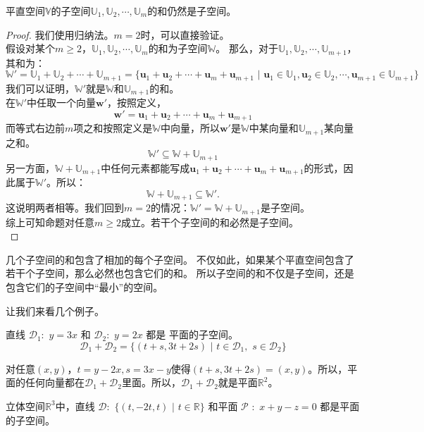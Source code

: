 \documentclass[12pt,UTF8,fontset=none]{ctexbook}
\begin{document}
\begin{pp}\label{pp:1_7}
    平直空间$\mathbb{V}$的子空间$\mathbb{U}_1, \mathbb{U}_2, \cdots , \mathbb{U}_m$的和仍然是子空间。
\end{pp}
\begin{proof} %
我们使用归纳法。$m=2$时，可以直接验证。\\
假设对某个$m \ge 2$，$\mathbb{U}_1, \mathbb{U}_2, \cdots , \mathbb{U}_m$的和为子空间$\mathbb{W}$。
那么，对于$\mathbb{U}_1, \mathbb{U}_2, \cdots , \mathbb{U}_{m+1}$，其和为：
$$ \mathbb{W}' = \mathbb{U}_1 + \mathbb{U}_2 + \cdots +\mathbb{U}_{m+1} = \{\mathbf{u}_1+\mathbf{u}_2+\cdots+\mathbf{u}_m+\mathbf{u}_{m+1} \,\, | \,\, \mathbf{u}_1 \in \mathbb{U}_1, \mathbf{u}_2 \in \mathbb{U}_2, \cdots , \mathbf{u}_{m+1} \in \mathbb{U}_{m+1} \}$$
我们可以证明，$\mathbb{W}'$就是$\mathbb{W}$和$\mathbb{U}_{m+1}$的和。\\
在$\mathbb{W}'$中任取一个向量$\mathbf{w}'$，按照定义，
$$\mathbf{w}' = \mathbf{u}_1+\mathbf{u}_2+\cdots+\mathbf{u}_m+\mathbf{u}_{m+1}$$
而等式右边前$m$项之和按照定义是$\mathbb{W}$中向量，所以$\mathbf{w}'$是$\mathbb{W}$中某向量和$\mathbb{U}_{m+1}$某向量之和。
$$\mathbb{W}' \subseteq \mathbb{W} + \mathbb{U}_{m+1}$$
另一方面，$\mathbb{W} + \mathbb{U}_{m+1}$中任何元素都能写成$\mathbf{u}_1+\mathbf{u}_2+\cdots+\mathbf{u}_m+\mathbf{u}_{m+1}$的形式，因此属于$\mathbb{W}'$。所以：
$$\mathbb{W} + \mathbb{U}_{m+1} \subseteq \mathbb{W}'.$$
这说明两者相等。我们回到$m=2$的情况：$\mathbb{W}' = \mathbb{W} + \mathbb{U}_{m+1}$是子空间。\\
综上可知命题对任意$m \ge 2$成立。若干个子空间的和必然是子空间。\\
\end{proof}


几个子空间的和包含了相加的每个子空间。
不仅如此，如果某个平直空间包含了若干个子空间，那么必然也包含它们的和。
所以子空间的和不仅是子空间，还是包含它们的子空间中“最小”的空间。

让我们来看几个例子。

直线 $\mathcal{D}_1: \,\, y = 3x$ 和 $\mathcal{D}_2: \,\, y = 2x$ 都是
平面的子空间。
$$\mathcal{D}_1 + \mathcal{D}_2 = \{(t+s, 3t+2s) \,\, | \,\, t \in \mathcal{D}_1, \,\, s \in \mathcal{D}_2 \}$$

对任意$(x,y)$，$t = y - 2x, s = 3x - y$使得$(t+s, 3t+2s) = (x, y)$。所以，平面的任何向量都在$\mathcal{D}_1 + \mathcal{D}_2$里面。所以，$\mathcal{D}_1 + \mathcal{D}_2$就是平面$\mathbb{R}^2$。

立体空间$\mathbb{R}^3$中，直线 $\mathcal{D}: \,\, \{(t,-2t,t) \,\, |\,\, t\in\mathbb{R}\}$ 和平面 $\mathcal{P} \,\, : \,\, x + y - z = 0$ 都是平面的子空间。
\end{document}
